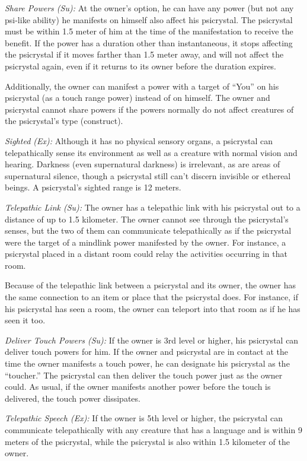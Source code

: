 \textit{Share Powers (Su):} At the owner's option, he can have any power (but not any psi-like ability) he manifests on himself also affect his psicrystal. The psicrystal must be within 1.5 meter of him at the time of the manifestation to receive the benefit. If the power has a duration other than instantaneous, it stops affecting the psicrystal if it moves farther than 1.5 meter away, and will not affect the psicrystal again, even if it returns to its owner before the duration expires.

Additionally, the owner can manifest a power with a target of ``You'' on his psicrystal (as a touch range power) instead of on himself. The owner and psicrystal cannot share powers if the powers normally do not affect creatures of the psicrystal's type (construct).

\textit{Sighted (Ex):} Although it has no physical sensory organs, a psicrystal can telepathically sense its environment as well as a creature with normal vision and hearing. Darkness (even supernatural darkness) is irrelevant, as are areas of supernatural silence, though a psicrystal still can't discern invisible or ethereal beings. A psicrystal's sighted range is 12 meters.

\textit{Telepathic Link (Su):} The owner has a telepathic link with his psicrystal out to a distance of up to 1.5 kilometer. The owner cannot see through the psicrystal's senses, but the two of them can communicate telepathically as if the psicrystal were the target of a mindlink power manifested by the owner. For instance, a psicrystal placed in a distant room could relay the activities occurring in that room.

Because of the telepathic link between a psicrystal and its owner, the owner has the same connection to an item or place that the psicrystal does. For instance, if his psicrystal has seen a room, the owner can teleport into that room as if he has seen it too.

\textit{Deliver Touch Powers (Su):} If the owner is 3rd level or higher, his psicrystal can deliver touch powers for him. If the owner and psicrystal are in contact at the time the owner manifests a touch power, he can designate his psicrystal as the ``toucher.'' The psicrystal can then deliver the touch power just as the owner could. As usual, if the owner manifests another power before the touch is delivered, the touch power dissipates.

\textit{Telepathic Speech (Ex):} If the owner is 5th level or higher, the psicrystal can communicate telepathically with any creature that has a language and is within 9 meters of the psicrystal, while the psicrystal is also within 1.5 kilometer of the owner.

